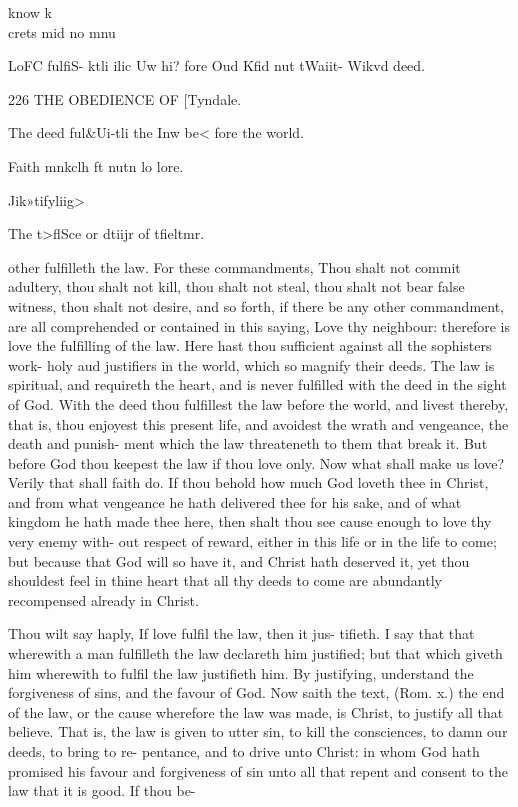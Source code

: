 \documentclass{custom}
\begin{document}
{know k\\ 

crets mid 
no mnu 

LoFC fulfiS- 
ktli ilic 
Uw hi? fore 
Oud Kfid 
nut tWaiit- 
Wikvd deed. 


226
THE OBEDIENCE OF
[Tyndale.

The deed 
ful&Ui-tli 
the Inw be< 
fore the 
world. 

Faith 
mnkclh ft 
nutn lo 
lore. 

Jik»tifyliig> 

The t>flSce 
or dtiijr 
of tfieltmr. 

other fulfilleth the law. For these commandments, Thou 
shalt not commit adultery, thou shalt not kill, thou shalt 
not steal, thou shalt not bear false witness, thou shalt not 
desire, and so forth, if there be any other commandment,
are all comprehended or contained in this saying, Love 
thy neighbour: therefore is love the fulfilling of the law. 
Here hast thou sufficient against all the sophisters work- 
holy aud justifiers in the world, which so magnify their 
deeds. The law is spiritual, and requireth the heart, and 
is never fulfilled with the deed in the sight of God. With 
the deed thou fulfillest the law before the world, and 
livest thereby, that is, thou enjoyest this present life, and 
avoidest the wrath and vengeance, the death and punish- 
ment which the law threateneth to them that break it. 
But before God thou keepest the law if thou love only. 
Now what shall make us love? Verily that shall faith 
do. If thou behold how much God loveth thee in Christ, 
and from what vengeance he hath delivered thee for his 
sake, and of what kingdom he hath made thee here, then 
shalt thou see cause enough to love thy very enemy with- 
out respect of reward, either in this life or in the life to 
come; but because that God will so have it, and Christ 
hath deserved it, yet thou shouldest feel in thine heart 
that all thy deeds to come are abundantly recompensed 
already in Christ. 

Thou wilt say haply, If love fulfil the law, then it jus- 
tifieth. I say that that wherewith a man fulfilleth the 
law declareth him justified; but that which giveth him 
wherewith to fulfil the law justifieth him. By justifying, 
understand the forgiveness of sins, and the favour of God.
Now saith the text, (Rom. x.) the end of the law, or the 
cause wherefore the law was made, is Christ, to justify 
all that believe. That is, the law is given to utter sin, to 
kill the consciences, to damn our deeds, to bring to re- 
pentance, and to drive unto Christ: in whom God hath 
promised his favour and forgiveness of sin unto all that 
repent and consent to the law that it is good. If thou be- 

}
\end{document}
